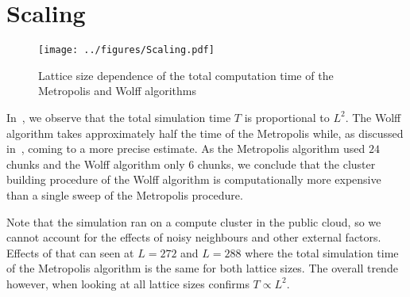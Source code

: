 \section{Scaling}\label{sec:scaling}
	\begin{figure}[htbp]
		\centering
		\texttt{[image: ../figures/Scaling.pdf]}
		\caption[Correlation of the computational effort and the lattice size]{Lattice size dependence of the total computation time of the Metropolis and Wolff algorithms}
		\label{fig:scaling}
	\end{figure}
	In~, we observe that the total simulation time $T$ is proportional to $L^2$. The Wolff algorithm takes approximately half the time of the Metropolis while, as discussed in~, coming to a more precise estimate. As the Metropolis algorithm used $24$ chunks and the Wolff algorithm only $6$ chunks, we conclude that the cluster building procedure of the Wolff algorithm is computationally more expensive than a single sweep of the Metropolis procedure.
	
	Note that the simulation ran on a compute cluster in the public cloud, so we cannot account for the effects of noisy neighbours and other external factors. Effects of that can seen at $L=272$ and $L=288$ where the total simulation time of the Metropolis algorithm is the same for both lattice sizes. The overall trende however, when looking at all lattice sizes confirms $T \propto L^2$.